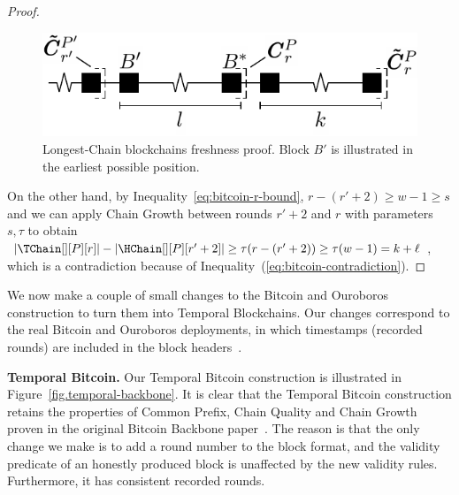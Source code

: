 \begin{proof}
  \begin{figure}
    \centering
    \includegraphics[width=0.5\columnwidth,keepaspectratio]{figures/longest-chain-proof.pdf}
    \caption{Longest-Chain blockchains freshness proof. Block $B'$ is illustrated in the
             earliest possible position.
    }
   \label{fig:longest-chain-freshness-proof}
  \end{figure}


  On the other hand, by Inequality~\ref{eq:bitcoin-r-bound}, $r - (r' + 2) \geq w - 1 \geq s$ and
  we can apply Chain Growth between rounds $r' + 2$ and $r$
  with parameters $s, \tau$ to obtain
  $|\TChain[][P][r]| - |\HChain[][P][r' + 2]| \geq \tau(r - (r' + 2)) \geq \tau (w - 1) =  k + \ell$,
  which is a contradiction because of Inequality~(\ref{eq:bitcoin-contradiction}).
  \Qed
\end{proof}

We now make a couple of small changes to the Bitcoin and Ouroboros
construction to turn them into Temporal Blockchains.
Our changes correspond to the real Bitcoin and Ouroboros deployments, in which timestamps (recorded rounds)
are included in the block
headers~\cite{mastering-bitcoin}. 

\noindent
\textbf{Temporal Bitcoin.}
Our Temporal Bitcoin construction is illustrated in Figure~\ref{fig.temporal-backbone}.
It is clear that the Temporal Bitcoin construction retains the properties of Common Prefix,
Chain Quality and Chain Growth proven in the original Bitcoin Backbone paper~\cite{backbone}.
The reason is that the only change we make is to add a round number to the block format, and
the validity predicate of an honestly produced block is unaffected by the new validity rules.
Furthermore, it has consistent recorded rounds.

